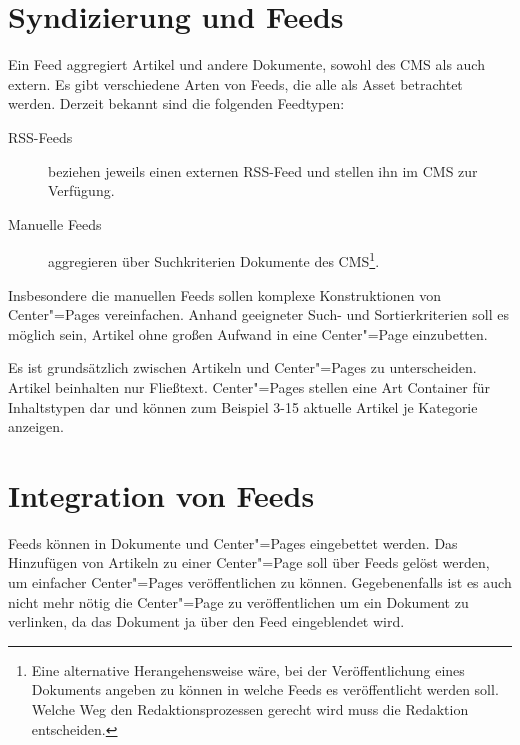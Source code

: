 %

\section{Syndizierung und Feeds} \label{sec-syndication}

Ein Feed aggregiert Artikel und andere Dokumente, sowohl des CMS als auch
extern.  Es gibt verschiedene Arten von Feeds, die alle als Asset betrachtet
werden.  Derzeit bekannt sind die folgenden Feedtypen:

\begin{description}

    \item [RSS-Feeds] beziehen jeweils einen externen RSS-Feed und stellen ihn
      im CMS zur Verfügung.

    \item[Manuelle Feeds] aggregieren über Suchkriterien Dokumente des
      CMS\footnote{Eine alternative Herangehensweise wäre, bei der
      Veröffentlichung eines Dokuments angeben zu können in welche Feeds es
      veröffentlicht werden soll. Welche Weg den Redaktionsprozessen gerecht
      wird muss die Redaktion entscheiden.}.

\end{description}

Insbesondere die manuellen Feeds sollen komplexe Konstruktionen von
Center"=Pages vereinfachen. Anhand geeigneter Such- und Sortierkriterien soll es
möglich sein, Artikel ohne großen Aufwand in eine Center"=Page einzubetten. 

Es ist grundsätzlich zwischen Artikeln und Center"=Pages zu 
unterscheiden. Artikel beinhalten nur Fließtext. Center"=Pages stellen 
eine Art Container für Inhaltstypen dar und können zum Beispiel 3-15 
aktuelle Artikel je Kategorie anzeigen.

\section{Integration von Feeds}

Feeds können in Dokumente und Center"=Pages eingebettet werden. Das Hinzufügen
von Artikeln zu einer Center"=Page soll über Feeds gelöst werden, um einfacher
Center"=Pages veröffentlichen zu können. Gegebenenfalls
ist es auch nicht mehr nötig die Center"=Page zu veröffentlichen um ein
Dokument zu verlinken, da das Dokument ja über den Feed eingeblendet wird.


